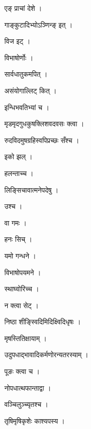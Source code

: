 \documentclass[10pt, openany]{book}
\begin{document}
\noindent एङ् प्राचां देशे ।

\noindent गाङ्कुटादिभ्योऽञ्णिन्ङ् इत् ।

\noindent विज इट् ।

\noindent विभाषोर्णोः ।

\noindent सार्वधातुकमपित् ।

\noindent असंयोगाल्लिट् कित् ।

\noindent इन्धिभवतिभ्यां च ।

\noindent मृडमृदगुधकुषक्लिशवदवसः क्त्वा ।

\noindent रुदविदमुषग्रहिस्वपिप्रच्छः सँश्च ।

\noindent इको झल् ।

\noindent हलन्ताच्च ।

\noindent लिङ्सिचावात्मनेपदेषु ।

\noindent उश्च ।

\noindent वा गमः ।

\noindent हनः सिच् ।

\noindent यमो गन्धने ।

\noindent विभाषोपयमने ।

\noindent स्थाघ्वोरिच्च ।

\noindent न क्त्वा सेट् ।

\noindent निष्ठा शीङ्स्विदिमिदिक्ष्विदिधृषः ।

\noindent मृषस्तितिक्षायाम् ।

\noindent उदुपधाद्भावादिकर्मणोरन्यतरस्याम् ।

\noindent पूङः क्त्वा च ।

\noindent नोपधात्थफान्ताद्वा ।

\noindent वञ्चिलुञ्च्यृतश्च ।

\noindent तृषिमृषिकृशेः काश्यपस्य ।
\end{document}
